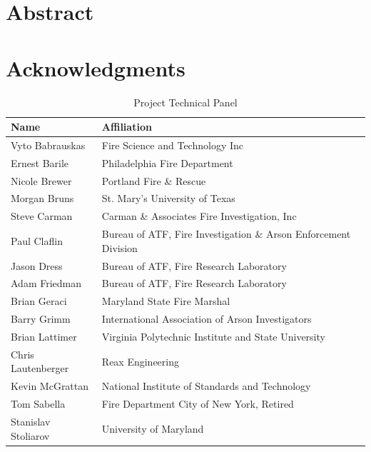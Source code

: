 \documentclass[12pt,oneside]{book}
\begin{document}
\newpage

\hypersetup{pageanchor=true}

\chapter*{Abstract}

\newpage
\frontmatter

\pagestyle{plain}

\cleardoublepage
{}
\tableofcontents

\cleardoublepage
{}
{}
\listoffigures

\cleardoublepage
{}
{}
\listoftables

\chapter*{\centering Acknowledgments}

\begin{table}[!ht]
	\centering
	\caption*{Project Technical Panel}
	\begin{tabular}{ll}
		\toprule[1.5pt]
		Name & Affiliation \\ 
		\midrule
		Vyto Babrauskas	 	& Fire Science and Technology Inc \\
		Ernest Barile	 	& Philadelphia Fire Department \\
		Nicole Brewer	 	& Portland Fire \& Rescue \\
		Morgan Bruns	 	& St. Mary's University of Texas \\		
		Steve Carman 		& Carman \& Associates Fire Investigation, Inc \\
		Paul Claflin 		& Bureau of ATF, Fire Investigation \& Arson Enforcement Division \\
		Jason Dress	    	& Bureau of ATF, Fire Research Laboratory \\
		Adam Friedman	    & Bureau of ATF, Fire Research Laboratory\\
		Brian Geraci 		& Maryland State Fire Marshal \\
		Barry Grimm 		& International Association of Arson Investigators \\
		Brian Lattimer	 	& Virginia Polytechnic Institute and State University \\
		Chris Lautenberger	& Reax Engineering \\
		Kevin McGrattan 	& National Institute of Standards and Technology \\ 
		Tom Sabella 		& Fire Department City of New York, Retired \\
		Stanislav Stoliarov	& University of Maryland \\ 
		\bottomrule[1.25pt]
	\end{tabular}
\end{table}
\end{document}
